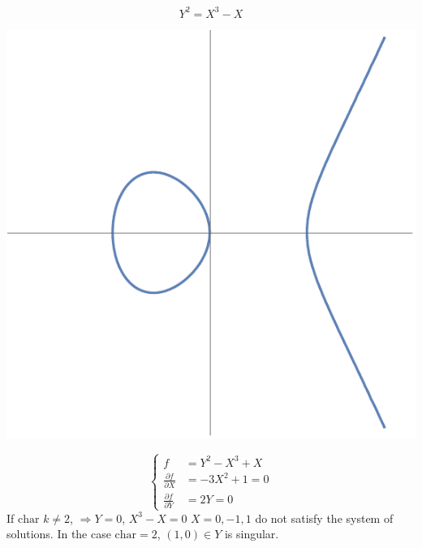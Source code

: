 \documentclass[11pt]{article}
\newcommand{\pd}{\partial}
\newcommand{\Lrta}{\Longrightarrow}
\begin{document}
$$Y^2=X^3-X$$
\begin{center}
\includegraphics[scale=0.5]{Y^2=X^3-X}
\end{center}
$$
\left\{ \begin{aligned}
f&=Y^2-X^3+X\\
\frac{\pd f}{\pd X}&=-3X^2+1=0\\
\frac{\pd f}{\pd Y}&=2Y=0
\end{aligned}\right.
$$
If $\text{char }k\neq 2$, $\Lrta Y=0$, $X^3-X=0$ $X=0,-1,1$ do not satisfy the system of solutions. In the case $\text{char}=2$, $(1,0)\in Y$ is singular.
\end{document}

